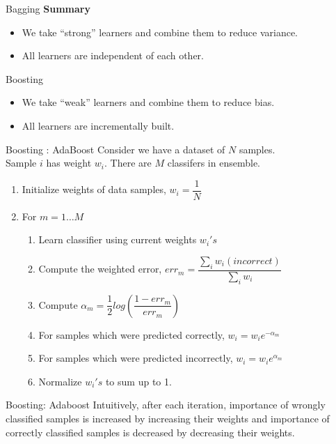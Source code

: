 \documentclass{beamer}
\begin{document}
	\begin{frame}{Bagging}
	\textbf{Summary}
	\begin{itemize}
		\item We take ``strong'' learners and combine them to reduce variance.
		\item All learners are independent of each other.
	\end{itemize}
	\end{frame}
	
	\begin{frame}{Boosting}
	\begin{itemize}
		\item We take ``weak'' learners and combine them to reduce bias.
		\item All learners are incrementally built.
	\end{itemize}
	\end{frame}
	
	\begin{frame}{Boosting : AdaBoost }
	Consider we have a dataset of $N$ samples.\\
	Sample $i$ has weight $w_i$. There are $M$ classifers in ensemble.\\
	\begin{enumerate}
		\item Initialize weights of data samples, $w_i = \dfrac{1}{N}$
		\item For $m = 1\dots M$
		\begin{enumerate}
			\item Learn classifier using current weights $w_i's$
			\item Compute the weighted error, $err_m = \dfrac{\sum\limits_iw_i(incorrect)}{\sum\limits_iw_i}$
			\item Compute $\alpha_m = \dfrac{1}{2}log\left(\dfrac{1 - err_m}{err_m}\right)$
			\item For samples which were predicted correctly, $w_i = w_ie^{-\alpha_m}$
			\item For samples which were predicted incorrectly, $w_i = w_ie^{\alpha_m}$  
			\item Normalize $w_i's$ to sum up to 1.
		\end{enumerate}
	\end{enumerate}
	\end{frame}
	
	\begin{frame}{Boosting: Adaboost}
	Intuitively, after each iteration, importance of wrongly classified samples is increased by increasing their weights and importance of correctly classified 		samples is decreased by decreasing their weights.
	\end{frame}
	
\end{document}
